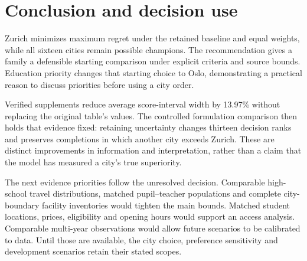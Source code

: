 \section{Conclusion and decision use}
Zurich minimizes maximum regret under the retained baseline and equal weights,
while all sixteen cities remain possible champions. The recommendation gives a
family a defensible starting comparison under explicit criteria and source
bounds. Education priority changes that starting choice to Oslo, demonstrating
a practical reason to discuss priorities before using a city order.

Verified supplements reduce average score-interval width by 13.97\% without
replacing the original table's values. The controlled formulation comparison
then holds that evidence fixed: retaining uncertainty changes thirteen decision
ranks and preserves completions in which another city exceeds Zurich. These
are distinct improvements in information and interpretation, rather than a
claim that the model has measured a city's true superiority.

The next evidence priorities follow the unresolved decision. Comparable
high-school travel distributions, matched pupil--teacher populations and
complete city-boundary facility inventories would tighten the main bounds.
Matched student locations, prices, eligibility and opening hours would support
an access analysis. Comparable multi-year observations would allow future
scenarios to be calibrated to data. Until those are available, the city choice,
preference sensitivity and development scenarios retain their stated scopes.
